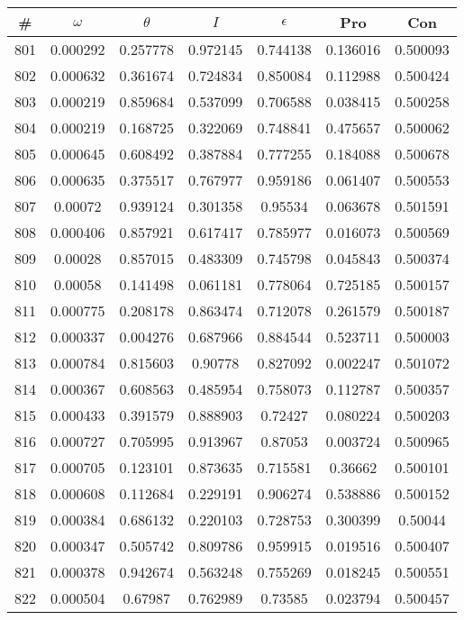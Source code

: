 \newpage
\begin{table}
\begin{tabular}{c|c|c|c|c|c|c}
\# & $\omega$ & $\theta$ & $I$ & $\epsilon$ & Pro & Con\\
\hline
801 & 0.000292 & 0.257778 & 0.972145 & 0.744138 & 0.136016 & 0.500093\\
802 & 0.000632 & 0.361674 & 0.724834 & 0.850084 & 0.112988 & 0.500424\\
803 & 0.000219 & 0.859684 & 0.537099 & 0.706588 & 0.038415 & 0.500258\\
804 & 0.000219 & 0.168725 & 0.322069 & 0.748841 & 0.475657 & 0.500062\\
805 & 0.000645 & 0.608492 & 0.387884 & 0.777255 & 0.184088 & 0.500678\\
806 & 0.000635 & 0.375517 & 0.767977 & 0.959186 & 0.061407 & 0.500553\\
807 & 0.00072 & 0.939124 & 0.301358 & 0.95534 & 0.063678 & 0.501591\\
808 & 0.000406 & 0.857921 & 0.617417 & 0.785977 & 0.016073 & 0.500569\\
809 & 0.00028 & 0.857015 & 0.483309 & 0.745798 & 0.045843 & 0.500374\\
810 & 0.00058 & 0.141498 & 0.061181 & 0.778064 & 0.725185 & 0.500157\\
811 & 0.000775 & 0.208178 & 0.863474 & 0.712078 & 0.261579 & 0.500187\\
812 & 0.000337 & 0.004276 & 0.687966 & 0.884544 & 0.523711 & 0.500003\\
813 & 0.000784 & 0.815603 & 0.90778 & 0.827092 & 0.002247 & 0.501072\\
814 & 0.000367 & 0.608563 & 0.485954 & 0.758073 & 0.112787 & 0.500357\\
815 & 0.000433 & 0.391579 & 0.888903 & 0.72427 & 0.080224 & 0.500203\\
816 & 0.000727 & 0.705995 & 0.913967 & 0.87053 & 0.003724 & 0.500965\\
817 & 0.000705 & 0.123101 & 0.873635 & 0.715581 & 0.36662 & 0.500101\\
818 & 0.000608 & 0.112684 & 0.229191 & 0.906274 & 0.538886 & 0.500152\\
819 & 0.000384 & 0.686132 & 0.220103 & 0.728753 & 0.300399 & 0.50044\\
820 & 0.000347 & 0.505742 & 0.809786 & 0.959915 & 0.019516 & 0.500407\\
821 & 0.000378 & 0.942674 & 0.563248 & 0.755269 & 0.018245 & 0.500551\\
822 & 0.000504 & 0.67987 & 0.762989 & 0.73585 & 0.023794 & 0.500457\\

\end{tabular}
\end{table}
